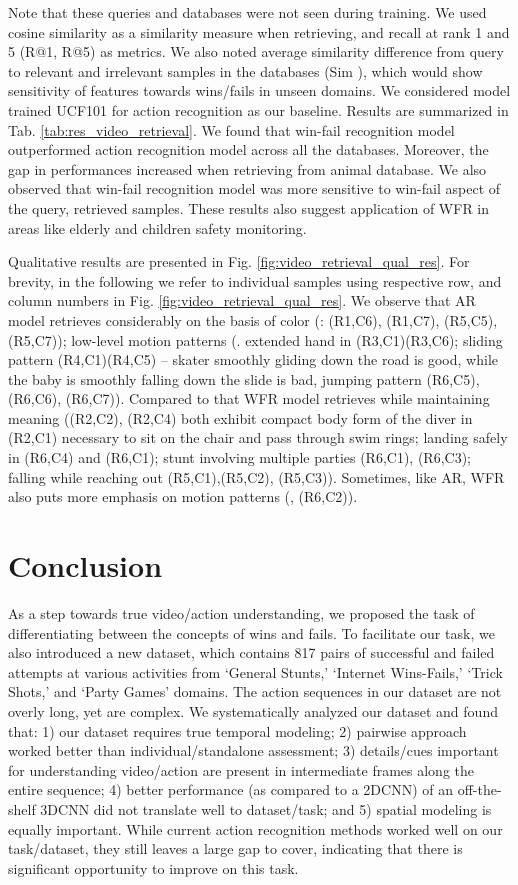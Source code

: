 \documentclass[final]{cvpr}
\begin{document}
Note that these queries and databases were not seen during training. We used cosine similarity as a similarity measure when retrieving, and recall at rank 1 and 5 (R@1, R@5) as metrics. We also noted average similarity difference from query to relevant and irrelevant samples in the databases (Sim ), which would show sensitivity of features towards wins/fails in unseen domains. We considered model trained UCF101 for action recognition as our baseline. Results are summarized in Tab. \ref{tab:res_video_retrieval}. We found that win-fail recognition model outperformed action recognition model across all the databases. Moreover, the gap in performances increased when retrieving from animal database. We also observed that win-fail recognition model was more sensitive to win-fail aspect of the query, retrieved samples. These results also suggest application of WFR in areas like elderly and children safety monitoring. 

Qualitative results are presented in Fig. \ref{fig:video_retrieval_qual_res}. For brevity, in the following we refer to individual samples using respective row, and column numbers in Fig. \ref{fig:video_retrieval_qual_res}. We observe that AR model retrieves considerably on the basis of color (\eg: (R1,C6), (R1,C7), (R5,C5), (R5,C7)); low-level motion patterns (\eg. extended hand in (R3,C1)(R3,C6); sliding pattern (R4,C1)(R4,C5) -- skater smoothly gliding down the road is good, while the baby is smoothly falling down the slide is bad, jumping pattern (R6,C5),(R6,C6), (R6,C7)). Compared to that WFR model retrieves while maintaining meaning (\eg (R2,C2), (R2,C4) both exhibit compact body form of the diver in (R2,C1) necessary to sit on the chair and pass through swim rings; landing safely in (R6,C4) and (R6,C1); stunt involving multiple parties (R6,C1), (R6,C3); falling while reaching out (R5,C1),(R5,C2), (R5,C3)). Sometimes, like AR, WFR also puts more emphasis on motion patterns (\eg, (R6,C2)). \section{Conclusion}
As a step towards true video/action understanding, we proposed the task of differentiating between the concepts of wins and fails. To facilitate our task, we also introduced a new dataset, which contains 817 pairs of successful and failed attempts at various activities from `General Stunts,' `Internet Wins-Fails,' `Trick Shots,' and `Party Games' domains. The action sequences in our dataset are not overly long, yet are complex. We systematically analyzed our dataset and found that: 1) our dataset requires true temporal modeling; 2) pairwise approach worked better than individual/standalone assessment; 3) details/cues important for understanding video/action are present in intermediate frames along the entire sequence; 4) better performance (as compared to a 2DCNN) of an off-the-shelf 3DCNN did not translate well to dataset/task; and 5) spatial modeling is equally important. While current action recognition methods worked well on our task/dataset, they still leaves a large gap to cover, indicating that there is significant opportunity to improve on this task. 

{\small


}
\end{document}
